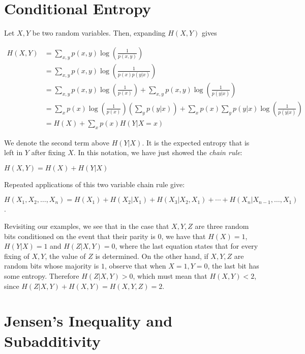 \documentclass[10pt]{article}
\begin{document}
\section{Conditional Entropy}

Let $X,Y$ be two random variables. Then, expanding $H(X,Y)$ gives

\begin{align*}
	H(X,Y) &= \sum_{x,y} p(x,y) \log \left(\frac{1}{p(x,y)} \right)  \\
	 & = \sum_{x,y} p(x,y) \log \left(\frac{1}{p(x)p(y|x)} \right) \\
	 & = \sum_{x,y} p(x,y) \log \left(\frac{1}{p(x)} \right) + \sum_{x,y} p(x,y) \log \left(\frac{1}{p(y|x)} \right) \\
	& = \sum_{x} p(x) \log \left(\frac{1}{p(x)} \right) \left(\sum_y p(y|x) \right) + \sum_{x} p(x) \sum_y p(y|x) \log \left(\frac{1}{p(y|x)} \right) \\
	& = H(X) + \sum_{x} p(x) H(Y|X=x)
\end{align*}

We denote the second term above $H(Y|X)$. It is the expected entropy that is left in $Y$ after fixing $X$. In this notation, we have just showed the \emph{chain rule}:

\begin{lemma} $H(X,Y) = H(X) + H(Y|X)$
\end{lemma}

Repeated applications of this two variable chain rule give:

\begin{lemma} $H(X_1,X_2, \dotsc, X_n) = H(X_1 ) + H(X_2|X_1) + H(X_3|X_2,X_1) + \dotsb + H(X_n | X_{n-1},\dotsc,X_1)$.
\end{lemma}

Revisiting our examples, we see that in the case that $X,Y,Z$ are three random bits conditioned on the event that their parity is $0$, we have that $H(X) = 1$, $H(Y|X) = 1$ and $H(Z|X,Y) = 0$, where the last equation states that for every fixing of $X,Y$, the value of $Z$ is determined. On the other hand, if $X,Y,Z$ are random bits whose majority is $1$, observe that when $X=1,Y=0$, the last bit has some entropy. Therefore $H(Z|X,Y) >0$, which must mean that $H(X,Y) < 2$, since $H(Z|X,Y) + H(X,Y) = H(X,Y,Z)=2$.

\section{Jensen's Inequality and Subadditivity}
\end{document}
